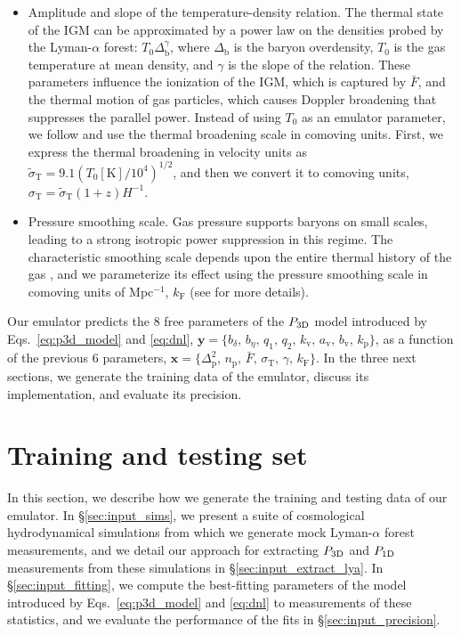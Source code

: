 \documentclass[fleqn,usenatbib]{mnras}
\newcommand{\lyaf}{Lyman-$\alpha$ forest\xspace}
\newcommand{\poned}{\ensuremath{P_{\rm 1D}}\xspace}
\newcommand{\pthreed}{\ensuremath{P_{\rm 3D}}\xspace}
\newcommand{\mflux}{\ensuremath{\bar{F}}\xspace}
\begin{document}
\begin{itemize}
    \item Amplitude and slope of the temperature-density relation. The thermal state of the IGM can be approximated by a power law on the densities probed by the \lyaf \citep{hydro_Lukic2015}: $T_0\Delta_\mathrm{b}^\gamma$, where $\Delta_\mathrm{b}$ is the baryon overdensity, $T_0$ is the gas temperature at mean density, and $\gamma$ is the slope of the relation. These parameters influence the ionization of the IGM, which is captured by \mflux, and the thermal motion of gas particles, which causes Doppler broadening that suppresses the parallel power. Instead of using $T_0$ as an emulator parameter, we follow \citet{Pedersen2021} and use the thermal broadening scale in comoving units. First, we express the thermal broadening in velocity units as $\tilde{\sigma}_\mathrm{T} = 9.1 (T_0[\mathrm{K}]/10^4)^{1/2}$, and then we convert it to comoving units, $\sigma_\mathrm{T}=\tilde{\sigma}_\mathrm{T}(1+z) H^{-1}$.

    \item Pressure smoothing scale. Gas pressure supports baryons on small scales, leading to a strong isotropic power suppression in this regime. The characteristic smoothing scale depends upon the entire thermal history of the gas \citep{gnedin1998ProbingUniverseLyalpha}, and we parameterize its effect using the pressure smoothing scale in comoving units of Mpc$^{-1}$, $k_\mathrm{F}$ (see \citet{Pedersen2021} for more details).
\end{itemize}

Our emulator predicts the 8 free parameters of the \pthreed model introduced by Eqs.~\ref{eq:p3d_model} and \ref{eq:dnl}, $\mathbf{y}=\{b_\delta,\, b_\eta,\, q_1,\, q_2,\, k_\mathrm{v},\, a_\mathrm{v},\, b_\mathrm{v}, \, k_\mathrm{p}\}$, as a function of the previous 6 parameters, $\mathbf{x}=\{\Delta_\mathrm{p}^2,\, n_\mathrm{p},\, \mflux,\, \sigma_\mathrm{T},\, \gamma,\, k_\mathrm{F}\}$. In the three next sections, we generate the training data of the emulator, discuss its implementation, and evaluate its precision.


\section{Training and testing set}
\label{sec:input}

In this section, we describe how we generate the training and testing data of our emulator. In \S\ref{sec:input_sims}, we present a suite of cosmological hydrodynamical simulations from which we generate mock \lyaf measurements, and we detail our approach for extracting \pthreed and \poned measurements from these simulations in \S\ref{sec:input_extract_lya}. In \S\ref{sec:input_fitting}, we compute the best-fitting parameters of the model introduced by Eqs.~\ref{eq:p3d_model} and \ref{eq:dnl} to measurements of these statistics, and we evaluate the performance of the fits in \S\ref{sec:input_precision}.
\end{document}
